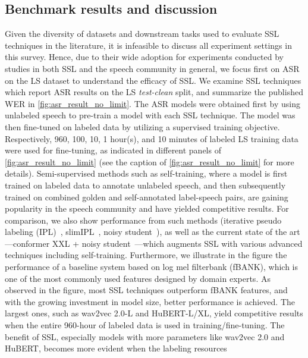 \subsection{Benchmark results and discussion} \label{sec:benchmark} 
Given the diversity of datasets and downstream tasks used to evaluate SSL
techniques in the literature, it is infeasible to discuss all 
experiment settings in this survey. Hence, due to their wide adoption for
experiments conducted by studies in both SSL and the speech community in
general, we focus first on ASR on the LS dataset to understand the
efficacy of SSL. We examine SSL techniques which report ASR results on the LS
\textit{test-clean} split, and summarize the published WER in
\cref{fig:asr_result_no_limit}. The ASR models were obtained first by using
unlabeled speech to pre-train a model with each SSL technique. The model was
then fine-tuned on labeled data by utilizing a supervised training objective.
Respectively, 960, 100, 10, 1 hour(s), and 10 minutes of labeled LS training data
were used for fine-tuning, as indicated in different panels of
\cref{fig:asr_result_no_limit} (see
the caption of \cref{fig:asr_result_no_limit} for more details).
Semi-supervised methods such as self-training, where a model is first trained
on labeled data to annotate unlabeled speech, and then subsequently trained on
combined golden and self-annotated label-speech pairs, are gaining popularity
in the speech community and have yielded competitive results. For comparison, we also
show performance from such methods (iterative pseudo labeling 
(IPL)~\cite{xu_iterative_2020}, slimIPL~\cite{likhomanenko2020slimipl}, noisy 
student~\cite{park_improved_2020}), as well as the current state of the art---conformer XXL + noisy
student~\cite{zhang2020pushing}---which augments SSL with various advanced
techniques including self-training. Furthermore, we illustrate in the figure
the performance of a baseline system \cite{yang_superb_2021} based on log mel filterbank (fBANK), which is one of the most commonly used features designed by domain experts.
As observed in the figure, most SSL techniques outperform fBANK
features, and with the growing investment in model size, better performance is
achieved. The largest ones, such as wav2vec 2.0-L and HuBERT-L/XL, yield
  competitive results                         %
when the entire 960-hour of labeled data is used in
training/fine-tuning. The benefit of SSL, especially models with more parameters
like wav2vec 2.0 and HuBERT, becomes more evident when the labeling resources
